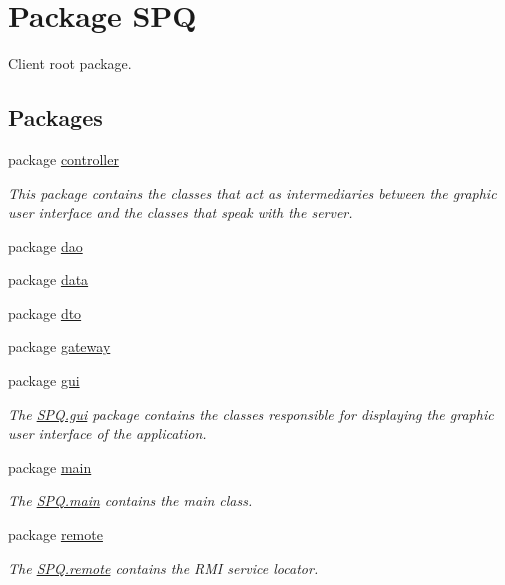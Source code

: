 \hypertarget{namespace_s_p_q}{}\section{Package S\+PQ}
\label{namespace_s_p_q}


Client root package.  


\subsection*{Packages}
\begin{DoxyCompactItemize}
\item 
package \mbox{\hyperlink{namespace_s_p_q_1_1controller}{controller}}
\begin{DoxyCompactList}\small\item\em This package contains the classes that act as intermediaries between the graphic user interface and the classes that speak with the server. \end{DoxyCompactList}\item 
package \mbox{\hyperlink{namespace_s_p_q_1_1dao}{dao}}
\item 
package \mbox{\hyperlink{namespace_s_p_q_1_1data}{data}}
\item 
package \mbox{\hyperlink{namespace_s_p_q_1_1dto}{dto}}
\item 
package \mbox{\hyperlink{namespace_s_p_q_1_1gateway}{gateway}}
\item 
package \mbox{\hyperlink{namespace_s_p_q_1_1gui}{gui}}
\begin{DoxyCompactList}\small\item\em The \mbox{\hyperlink{namespace_s_p_q_1_1gui}{S\+P\+Q.\+gui}} package contains the classes responsible for displaying the graphic user interface of the application. \end{DoxyCompactList}\item 
package \mbox{\hyperlink{namespace_s_p_q_1_1main}{main}}
\begin{DoxyCompactList}\small\item\em The \mbox{\hyperlink{namespace_s_p_q_1_1main}{S\+P\+Q.\+main}} contains the main class. \end{DoxyCompactList}\item 
package \mbox{\hyperlink{namespace_s_p_q_1_1remote}{remote}}
\begin{DoxyCompactList}\small\item\em The \mbox{\hyperlink{namespace_s_p_q_1_1remote}{S\+P\+Q.\+remote}} contains the R\+MI service locator. \end{DoxyCompactList}\end{DoxyCompactItemize}
